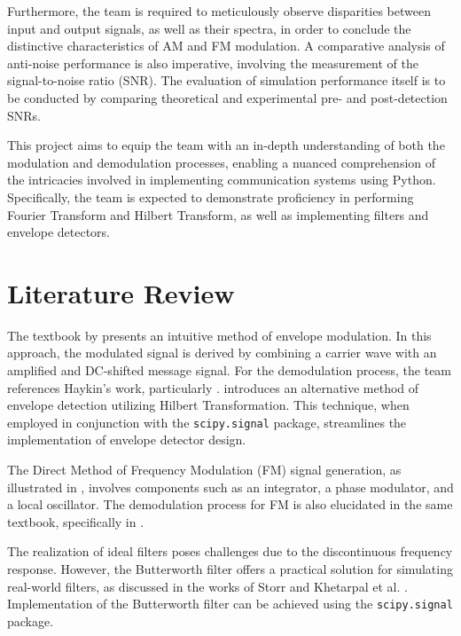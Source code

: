 \documentclass[../ECE459FinalProjectReport.tex]{subfiles}
\begin{document}
Furthermore, the team is required to meticulously observe disparities between input and output signals, as well as their spectra, in order to conclude the distinctive characteristics of AM and FM modulation. A comparative analysis of anti-noise performance is also imperative, involving the measurement of the signal-to-noise ratio (SNR). The evaluation of simulation performance itself is to be conducted by comparing theoretical and experimental pre- and post-detection SNRs.

This project aims to equip the team with an in-depth understanding of both the modulation and demodulation processes, enabling a nuanced comprehension of the intricacies involved in implementing communication systems using Python. Specifically, the team is expected to demonstrate proficiency in performing Fourier Transform and Hilbert Transform, as well as implementing filters and envelope detectors.


\section{Literature Review}

The textbook by \textcite[Sec. 3.1]{haykinIntroductionAnalogDigital2007} presents an intuitive method of envelope modulation. In this approach, the modulated signal is derived by combining a carrier wave with an amplified and DC-shifted message signal. For the demodulation process, the team references Haykin's work, particularly \cite[Fig. 9.8]{haykinIntroductionAnalogDigital2007}. \textcite{ulrichEnvelopeCalculationHilbert2006} introduces an alternative method of envelope detection utilizing Hilbert Transformation. This technique, when employed in conjunction with the \verb|scipy.signal| package, streamlines the implementation of envelope detector design.

The Direct Method of Frequency Modulation (FM) signal generation, as illustrated in \cite[Fig. 4.7]{haykinIntroductionAnalogDigital2007}, involves components such as an integrator, a phase modulator, and a local oscillator. The demodulation process for FM is also elucidated in the same textbook, specifically in \cite[Fig. 9.13]{haykinIntroductionAnalogDigital2007}.

The realization of ideal filters poses challenges due to the discontinuous frequency response. However, the Butterworth filter offers a practical solution for simulating real-world filters, as discussed in the works of Storr \cite{storrButterworthFilterDesign2013} and Khetarpal et al. \cite{khetarpalZaiPythonZhongShiXianDiTongLuBoQi2022}. Implementation of the Butterworth filter can be achieved using the \verb|scipy.signal| package.
\end{document}
